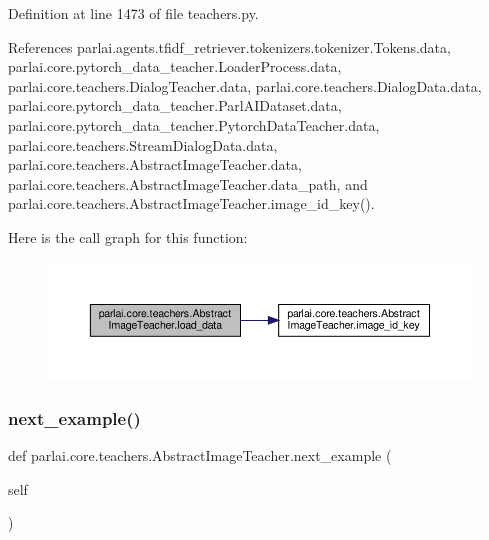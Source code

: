 Definition at line 1473 of file teachers.\+py.



References parlai.\+agents.\+tfidf\+\_\+retriever.\+tokenizers.\+tokenizer.\+Tokens.\+data, parlai.\+core.\+pytorch\+\_\+data\+\_\+teacher.\+Loader\+Process.\+data, parlai.\+core.\+teachers.\+Dialog\+Teacher.\+data, parlai.\+core.\+teachers.\+Dialog\+Data.\+data, parlai.\+core.\+pytorch\+\_\+data\+\_\+teacher.\+Parl\+A\+I\+Dataset.\+data, parlai.\+core.\+pytorch\+\_\+data\+\_\+teacher.\+Pytorch\+Data\+Teacher.\+data, parlai.\+core.\+teachers.\+Stream\+Dialog\+Data.\+data, parlai.\+core.\+teachers.\+Abstract\+Image\+Teacher.\+data, parlai.\+core.\+teachers.\+Abstract\+Image\+Teacher.\+data\+\_\+path, and parlai.\+core.\+teachers.\+Abstract\+Image\+Teacher.\+image\+\_\+id\+\_\+key().

Here is the call graph for this function\+:
\nopagebreak
\begin{figure}[H]
\begin{center}
\leavevmode
\includegraphics[width=350pt]{classparlai_1_1core_1_1teachers_1_1AbstractImageTeacher_ad110a80a077e9e1135d4241083786199_cgraph}
\end{center}
\end{figure}
\mbox{\label{classparlai_1_1core_1_1teachers_1_1AbstractImageTeacher_ae519608a207d86bd7801f3043ff0ebf5}} 
\subsubsection{\texorpdfstring{next\+\_\+example()}{next\_example()}}
{\footnotesize\ttfamily def parlai.\+core.\+teachers.\+Abstract\+Image\+Teacher.\+next\+\_\+example (\begin{DoxyParamCaption}\item[{}]{self }\end{DoxyParamCaption})}

